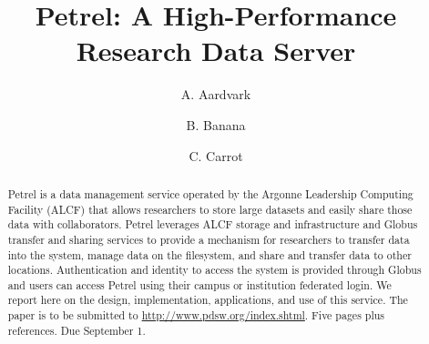 \documentclass[sigconf]{acmart}
\begin{document}
\title{Petrel: A High-Performance Research Data Server}

\author{A. Aardvark}

\author{B. Banana}

\author{C. Carrot}

%
%
%

\renewcommand{\shortauthors}{A. Aardvark et al.}


\begin{abstract}
Petrel is a data management service operated by the Argonne Leadership Computing Facility (ALCF)
that allows researchers to store large datasets and easily share those data with collaborators. 
Petrel leverages ALCF
storage and infrastructure and Globus transfer and sharing services to provide a mechanism for researchers to transfer data into the system, manage data on the filesystem, and share and transfer data to other locations. Authentication and identity to access the system is provided through Globus and users can access Petrel using their campus or institution federated login.
We report here on the design, implementation, applications, and use of this service.
The paper is to be submitted to \url{http://www.pdsw.org/index.shtml}. Five pages plus references. Due September 1. 
\end{abstract}
\end{document}
